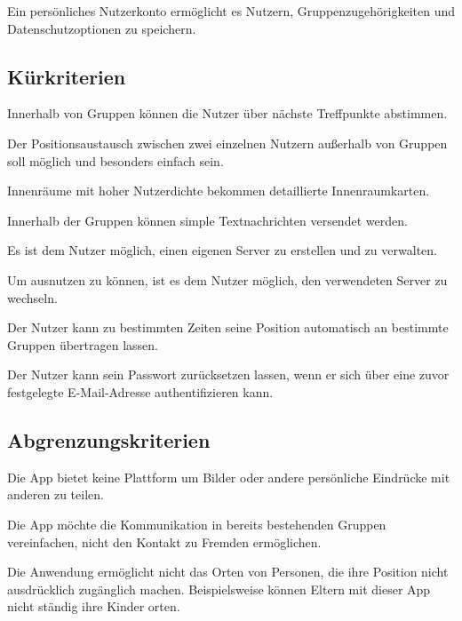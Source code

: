 \documentclass[parskip=full,11pt]{scrartcl}
\begin{document}
Ein persönliches Nutzerkonto ermöglicht es Nutzern,
Gruppenzugehörigkeiten und Datenschutzoptionen zu speichern.

\subsection{Kürkriterien}
Innerhalb von Gruppen können die Nutzer über nächste Treffpunkte abstimmen.

Der Positionsaustausch zwischen zwei einzelnen Nutzern außerhalb von Gruppen
soll möglich und besonders einfach sein.

Innenräume mit hoher Nutzerdichte bekommen detaillierte Innenraumkarten.

Innerhalb der Gruppen können simple Textnachrichten versendet werden.

Es ist dem Nutzer möglich, einen eigenen Server zu erstellen und zu verwalten.

Um  ausnutzen zu können, ist es dem Nutzer
möglich, den verwendeten Server zu wechseln.

Der Nutzer kann zu bestimmten Zeiten seine Position automatisch an bestimmte
Gruppen übertragen lassen.

Der Nutzer kann sein Passwort zurücksetzen lassen, wenn er sich über eine zuvor
festgelegte E-Mail-Adresse authentifizieren kann.

\subsection{Abgrenzungskriterien}
Die App bietet keine Plattform um Bilder oder andere persönliche Eindrücke mit
anderen zu teilen.

Die App möchte die Kommunikation in bereits bestehenden Gruppen vereinfachen,
nicht den Kontakt zu Fremden ermöglichen.

Die Anwendung ermöglicht nicht das Orten von Personen,
die ihre Position nicht ausdrücklich zugänglich machen.
Beispielsweise können Eltern mit dieser App nicht ständig ihre Kinder orten.
\end{document}
